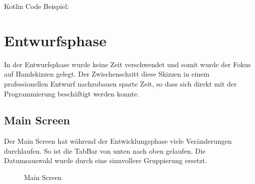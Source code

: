 \documentclass[
    DIV12,
    cleardouble=plain,
    headings=normal,
    pdftex,
    headexclude,footexclude,
    final
]{scrreprt}
\begin{document}
Kotlin Code Beispiel:


\newpage

\chapter{Entwurfsphase}
In der Entwurfsphase wurde keine Zeit verschwendet und somit wurde der Fokus auf Handskizzen gelegt. Der Zwischenschritt diese Skizzen in einem professionellen Entwurf nachzubauen sparte Zeit, so dass sich direkt mit der Programmierung beschäftigt werden konnte.


\section{Main Screen}
Der Main Screen hat während der Entwicklungsphase viele Veränderungen durchlaufen. So ist die TabBar von unten nach oben gelaufen. Die Datumsauswahl wurde durch eine sinnvollere Gruppierung ersetzt.
\begin{figure}[H]
	\centering
	\caption{Main Screen}
	\label{main}
\end{figure}
\end{document}
